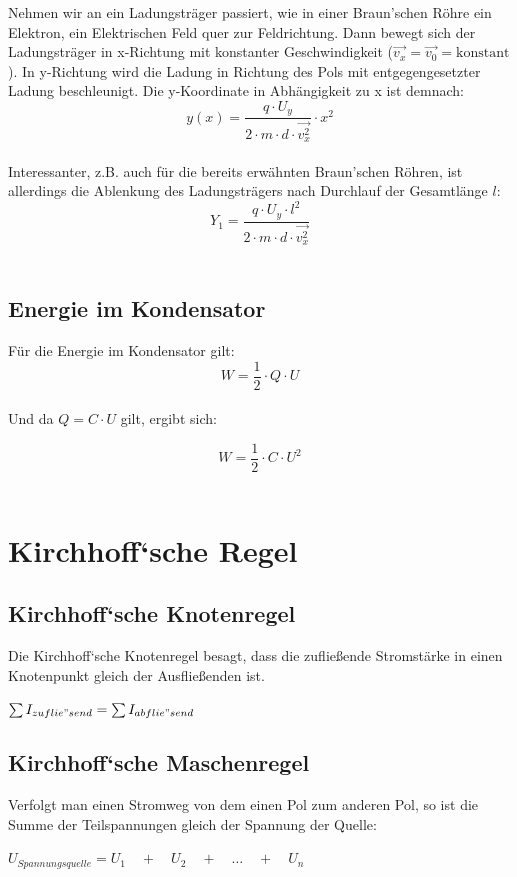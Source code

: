 \documentclass[a4paper]{article}
\begin{document}
Nehmen wir an ein Ladungsträger passiert, wie in einer Braun'schen Röhre ein Elektron, ein Elektrischen Feld
quer zur Feldrichtung. Dann bewegt sich der Ladungsträger in x-Richtung mit konstanter Geschwindigkeit
($\vec{v_x} = \vec{v_0} = \text{konstant}$). In y-Richtung wird die Ladung in Richtung des Pols mit entgegengesetzter Ladung
beschleunigt. Die y-Koordinate in Abhängigkeit zu x ist demnach:\\ $$y(x) = \dfrac{q \cdot U_y}{2 \cdot m \cdot d \cdot \vec{v_x ^2}} \cdot x^2$$\\

Interessanter, z.B. auch für die bereits erwähnten Braun'schen Röhren, ist allerdings die Ablenkung des Ladungsträgers
nach Durchlauf der Gesamtlänge $l$:\\

\Large$$Y_1 = \dfrac{q \cdot U_y \cdot l^2}{2 \cdot m \cdot d \cdot \vec{v_x ^2}}$$\\ \normalsize



\newpage
\subsection{Energie im Kondensator}

Für die Energie im Kondensator gilt:\\

$$W = \frac{1}{2} \cdot Q \cdot U$$\\

Und da $Q = C \cdot U$ gilt, ergibt sich:

\Large$$W = \frac{1}{2} \cdot C \cdot U^2$$\\ \normalsize





\section{Kirchhoff‘sche Regel}
\subsection{Kirchhoff‘sche Knotenregel}
Die Kirchhoff‘sche Knotenregel besagt, dass die zufließende Stromstärke in einen Knotenpunkt gleich der
Ausfließenden ist.

\begin{center}
    \Large 
        $\sum{I_{zuflie"send}} = \sum{I_{abflie"send}}$\\[1cm]
    \normalsize
\end{center}


\subsection{Kirchhoff‘sche Maschenregel}
Verfolgt man einen Stromweg von dem einen Pol zum anderen Pol, so ist die Summe der
Teilspannungen gleich der Spannung der Quelle:


\begin{center}
    \Large 
        $U_{Spannungsquelle} = U_1 \quad + \quad U_2 \quad + \quad \dots \quad + \quad U_n$\\[1cm]
    \normalsize
\end{center}
\end{document}
